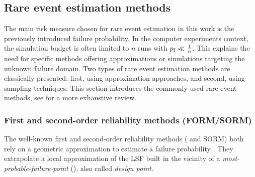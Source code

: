 \subsection{Rare event estimation methods}\label{sec:rare_event}

The main risk measure chosen for rare event estimation in this work is the previously introduced failure probability. 
In the computer experiments context, the simulation budget is often limited to $n$ runs with $p_\mathrm{f} \ll \frac1n$. 
This explains the need for specific methods offering approximations or simulations targeting the unknown failure domain. 
Two types of rare event estimation methods are classically presented: first, using approximation approaches, and second, using sampling techniques. 
This section introduces the commonly used rare event methods, see \cite{MorioBalesdent2015} for a more exhaustive review.


\subsubsection{First and second-order reliability methods (FORM/SORM)}

The well-known first and second-order reliability methods ( and SORM) both rely on a geometric approximation to estimate a failure probability \citep{lemaire_2009}. 
They extrapolate a local approximation of the LSF built in the vicinity of a \textit{most-probable-failure-point} (), also called \textit{design point}.

